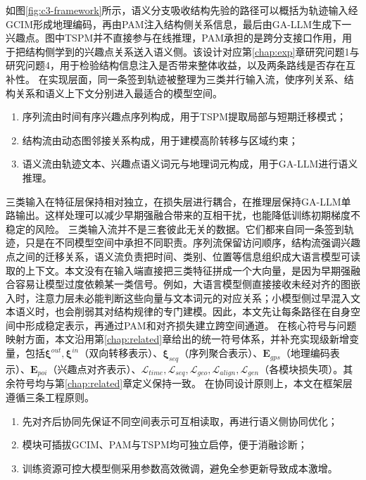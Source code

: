 如图\ref{fig:c3-framework}所示，语义分支吸收结构先验的路径可以概括为轨迹输入经GCIM形成地理编码，再由PAM注入结构侧关系信息，最后由GA-LLM生成下一兴趣点。图中TSPM并不直接参与在线推理，PAM承担的是跨分支接口作用，用于把结构侧学到的兴趣点关系送入语义侧。该设计对应第\ref{chap:exp}章研究问题1与研究问题4，用于检验结构信息注入是否带来整体收益，以及两条路线是否存在互补性。
在实现层面，同一条签到轨迹被整理为三类并行输入流，使序列关系、结构关系和语义上下文分别进入最适合的模型空间。
\begin{enumerate}
    \item {\heiti{}序列流}由时间有序兴趣点序列构成，用于TSPM提取局部与短期迁移模式；
    \item {\heiti{}结构流}由动态图邻接关系构成，用于建模高阶转移与区域约束；
    \item {\heiti{}语义流}由轨迹文本、兴趣点语义词元与地理词元构成，用于GA-LLM进行语义推理。
\end{enumerate}
\par\indent 三类输入在特征层保持相对独立，在损失层进行耦合，在推理层保持GA-LLM单路输出。这样处理可以减少早期强融合带来的互相干扰，也能降低训练初期梯度不稳定的风险。
三类输入流并不是三套彼此无关的数据。它们都来自同一条签到轨迹，只是在不同模型空间中承担不同职责。序列流保留访问顺序，结构流强调兴趣点之间的迁移关系，语义流负责把时间、类别、位置等信息组织成大语言模型可读取的上下文。本文没有在输入端直接把三类特征拼成一个大向量，是因为早期强融合容易让模型过度依赖某一类信号。例如，大语言模型侧直接接收未经对齐的图嵌入时，注意力层未必能判断这些向量与文本词元的对应关系；小模型侧过早混入文本语义时，也会削弱其对结构规律的专门建模。因此，本文先让每条路径在自身空间中形成稳定表示，再通过PAM和对齐损失建立跨空间通道。
在核心符号与问题映射方面，本文沿用第\ref{chap:related}章给出的统一符号体系，并补充实现级新增变量，包括$\boldsymbol{\xi}^{out},\boldsymbol{\xi}^{in}$（双向转移表示）、$\boldsymbol{\xi}_{seq}$（序列聚合表示）、$\mathbf{E}_{gps}$（地理编码表示）、$\mathbf{E}_{poi}$（兴趣点对齐表示）、$\mathcal{L}_{time},\mathcal{L}_{seq},\mathcal{L}_{geo},\mathcal{L}_{align},\mathcal{L}_{gen}$（各模块损失项）。其余符号均与第\ref{chap:related}章定义保持一致。
在协同设计原则上，本文在框架层遵循三条工程原则。
\begin{enumerate}
    \item {\heiti{}先对齐后协同}先保证不同空间表示可互相读取，再进行语义侧协同优化；
    \item {\heiti{}模块可插拔}GCIM、PAM与TSPM均可独立启停，便于消融诊断；
    \item {\heiti{}训练资源可控}大模型侧采用参数高效微调，避免全参更新导致成本激增。
\end{enumerate}
